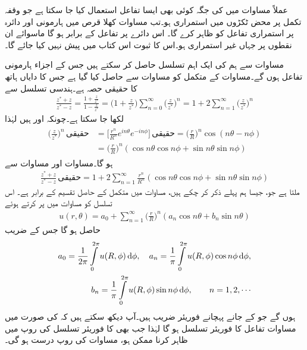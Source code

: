 عملاً مساوات  میں  کی جگہ کوئی بھی ایسا تفاعل استعمال کیا جا سکتا ہے جو وقفہ تکمل پر محض ٹکڑوں میں استمراری ہو۔تب مساوات  کھلا قرص  میں  ہارمونی اور دائرہ  پر استمراری  تفاعل  کو ظاہر کرے گا۔ اس دائرے پر تفاعل  کے برابر ہو گا ماسوائے ان نقطوں پر جہاں  غیر استمراری ہو۔اس کا ثبوت اس کتاب میں پیش نہیں کیا جائے گا۔

مساوات  سے ہم  کی ایک اہم تسلسل حاصل کر سکتے ہیں جس کے اجزاء ہارمونی تفاعل ہوں گے۔مساوات  کے متکمل کو مساوات   سے حاصل کیا گیا ہے جس کا دایاں ہاتھ   کا حقیقی حصہ ہے۔ہندسی تسلسل سے
\begin{align}\label{مساوات_مخفی_معمہ_ث}
\frac{z^*+z}{z^*-z}=\frac{1+\frac{z}{z^*}}{1-\frac{z}{z^*}}=\big(1+\frac{z}{z^*}\big)\sum_{n=0}^{\infty}\big(\frac{z}{z^*}\big)^{\!\!n}=1+2\sum_{n=1}^{\infty}\big(\frac{z}{z^*}\big)^{\!\!n}
\end{align} 
لکھا جا سکتا ہے۔چونکہ  اور  ہیں لہٰذا 
\begin{gather}
\begin{aligned}\label{مساوات_مخفی_معمہ_ج}
\big(\frac{z}{z^*}\big)^{\!\!n}\,\text{حقیقی} &=\big[\frac{r^n}{R^n}e^{in\theta}e^{-in\phi}\big]\,\text{حقیقی}=\big(\frac{r}{R}\big)^{\!\!n}\cos(n\theta-n\phi)\\
&=\big(\frac{r}{R}\big)^{\!\!n}(\cos n\theta\cos n\phi+\sin n\theta\sin n \phi)
\end{aligned}
\end{gather}
ہو گا۔مساوات  اور مساوات  سے
\begin{align*}
\frac{z^*+z}{z^*-z}\,\text{حقیقی}=1+2\sum_{n=1}^{\infty}\frac{r^n}{R^n}(\cos n\theta \cos n\phi+\sin n\theta\sin n\phi)
\end{align*}
ملتا ہے جو، جیسا ہم پہلے ذکر کر چکے ہیں، مساوات  میں متکمل کے حاصل تقسیم کے برابر ہے۔ اس تسلسل کو مساوات  میں پر کرتے ہوئے 
\begin{align}\label{مساوات_مخفی_معمہ_چ}
u(r,\theta)=a_0+\sum_{n=1}^{\infty} \big(\frac{r}{R}\big)^{\!\!n}(a_n\cos n\theta+b_n\sin n \theta)
\end{align}
حاصل ہو گا جس کے  ضریب 
\begin{gather}
\begin{aligned}\label{مساوات_مخفی_معمہ_ح}
a_0=\frac{1}{2\pi}\int\limits_{0}^{2\pi}u(R,\phi)\dif \phi,\quad  a_n=\frac{1}{\pi}\int\limits_{0}^{2\pi}u(R,\phi)\cos n\phi \dif \phi,\\
b_n=\frac{1}{\pi}\int\limits_{0}^{2\pi}u(R,\phi)\sin n\phi \dif \phi,\quad \quad n=1,2,\cdots
\end{aligned}
\end{gather}
ہوں گے جو  کے جانے پہچانے فوریئر  ضریب  ہیں۔آپ دیکھ سکتے ہیں کہ  کی صورت میں مساوات  تفاعل  کا فوریئر تسلسل ہو گا لہٰذا جب بھی  کا فوریئر تسلسل کی روپ میں ظاہر کرنا ممکن ہو، مساوات  کی روپ درست ہو گی۔ 

